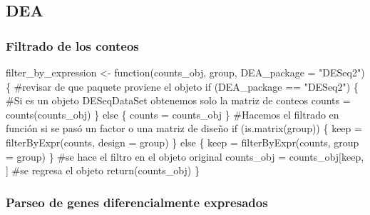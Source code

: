 \documentclass[
  9pt,
]{article}
\newenvironment{Shaded}{\begin{snugshade}}{\end{snugshade}}
\newcommand{\NormalTok}[1]{\textcolor[rgb]{0.00,0.23,0.31}{#1}}
\begin{document}
\subsection{DEA}\label{dea-1}

\subsubsection{Filtrado de los conteos}\label{filt_func}

\begin{Shaded}
\begin{Highlighting}[]
\NormalTok{filter\_by\_expression \textless{}{-} function(counts\_obj, group, DEA\_package = "DESeq2") \{}
\NormalTok{  \#revisar de que paquete proviene el objeto}
\NormalTok{  if (DEA\_package == "DESeq2") \{}
\NormalTok{    \#Si es un objeto DESeqDataSet obtenemos solo la matriz de conteos}
\NormalTok{    counts = counts(counts\_obj)}
\NormalTok{  \} else \{}
\NormalTok{    counts = counts\_obj}
\NormalTok{  \}}
\NormalTok{  \#Hacemos el filtrado en función si se pasó un factor o una matriz de diseño}
\NormalTok{  if (is.matrix(group)) \{}
\NormalTok{    keep = filterByExpr(counts, design = group)}
\NormalTok{  \} else \{}
\NormalTok{    keep = filterByExpr(counts, group = group)}
\NormalTok{  \}}
\NormalTok{  \#se hace el filtro en el objeto original}
\NormalTok{  counts\_obj = counts\_obj[keep, ]}
\NormalTok{  \#se regresa el objeto}
\NormalTok{  return(counts\_obj)}
\NormalTok{\}}
\end{Highlighting}
\end{Shaded}

\subsubsection{Parseo de genes diferencialmente
expresados}\label{parse_DE}
\end{document}
